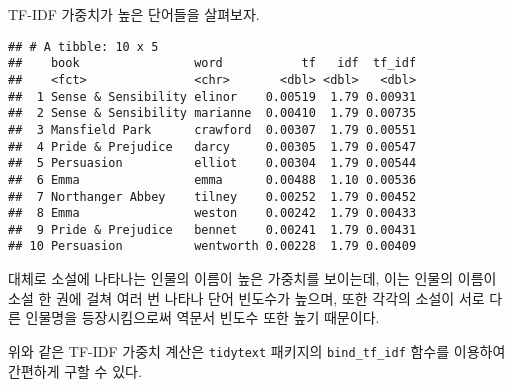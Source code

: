 \documentclass[]{book}
\newenvironment{Shaded}{\begin{snugshade}}{\end{snugshade}}
\newcommand{\DataTypeTok}[1]{\textcolor[rgb]{0.13,0.29,0.53}{#1}}
\newcommand{\DecValTok}[1]{\textcolor[rgb]{0.00,0.00,0.81}{#1}}
\newcommand{\KeywordTok}[1]{\textcolor[rgb]{0.13,0.29,0.53}{\textbf{#1}}}
\newcommand{\NormalTok}[1]{#1}
\newcommand{\OperatorTok}[1]{\textcolor[rgb]{0.81,0.36,0.00}{\textbf{#1}}}
\newcommand{\StringTok}[1]{\textcolor[rgb]{0.31,0.60,0.02}{#1}}
\begin{document}
TF-IDF 가중치가 높은 단어들을 살펴보자.

\begin{Shaded}
\end{Shaded}

\begin{verbatim}
## # A tibble: 10 x 5
##    book                word           tf   idf  tf_idf
##    <fct>               <chr>       <dbl> <dbl>   <dbl>
##  1 Sense & Sensibility elinor    0.00519  1.79 0.00931
##  2 Sense & Sensibility marianne  0.00410  1.79 0.00735
##  3 Mansfield Park      crawford  0.00307  1.79 0.00551
##  4 Pride & Prejudice   darcy     0.00305  1.79 0.00547
##  5 Persuasion          elliot    0.00304  1.79 0.00544
##  6 Emma                emma      0.00488  1.10 0.00536
##  7 Northanger Abbey    tilney    0.00252  1.79 0.00452
##  8 Emma                weston    0.00242  1.79 0.00433
##  9 Pride & Prejudice   bennet    0.00241  1.79 0.00431
## 10 Persuasion          wentworth 0.00228  1.79 0.00409
\end{verbatim}

대체로 소설에 나타나는 인물의 이름이 높은 가중치를 보이는데, 이는 인물의 이름이 소설 한 권에 걸쳐 여러 번 나타나 단어 빈도수가 높으며, 또한 각각의 소설이 서로 다른 인물명을 등장시킴으로써 역문서 빈도수 또한 높기 때문이다.

위와 같은 TF-IDF 가중치 계산은 \texttt{tidytext} 패키지의 \texttt{bind\_tf\_idf} 함수를 이용하여 간편하게 구할 수 있다.

\begin{Shaded}
\end{Shaded}
\end{document}
